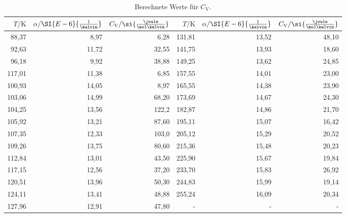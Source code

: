 \begin{table}[htpb]
	\centering
	\caption{Berechnete Werte für $C_\text{V}$.}
	\label{tab:cv}
	\begin{tabular}{rrr|rrr}
		\toprule
		$T/\si{\kelvin}$ & $\alpha/\SI{E-6}{\frac{1}{\kelvin}}$  & $C_\text{V}/\si{\frac{\joule}{\mol \kelvin}}$ & $T/\si{\kelvin}$ & $\alpha/\SI{E-6}{\frac{1}{\kelvin}}$  & $C_\text{V}/\si{\frac{\joule}{\mol \kelvin}}$\\
		\hline
		88,37	&	8,97	&	6,28	&	131,81	&	13,52	&	48,10	\\
		92,63	&	11,72	&	32,55	&	141,75	&	13,93	&	18,60	\\
		96,18	&	9,92	&	38,88	&	149,25	&	13,62	&	24,85	\\
		117,01	&	11,38	&	6,85	&	157,55	&	14,01	&	23,00	\\
		100,93	&	14,05	&	8,97	&	165,55	&	14,38	&	23,90	\\
		103,06	&	14,99	&	68,20	&	173,69	&	14,67	&	24,30	\\
		104,25	&	13,56	&	122,2	&	182,87	&	14,86	&	21,70	\\
		105,92	&	13,21	&	87,60	&	195,11	&	15,07	&	16,42	\\
		107,35	&	12,33	&	103,0	&	205,12	&	15,29	&	20,52	\\
		109,26	&	13,75	&	80,60	&	215,36	&	15,48	&	20,23	\\
		112,84	&	13,01	&	43,50	&	225,90	&	15,67	&	19,84	\\
		117,15	&	12,56	&	37,20	&	233,70	&	15,83	&	26,92	\\
		120,51	&	13,96	&	50,30	&	244,83	&	15,99	&	19,14	\\
		124,11	&	13,41	&	48,88	&	255,24	&	16,09	&	20,34	\\
		127,96	&	12,91	&	47,80	&	 -	    &	-	    &	-	    \\
		\bottomrule
	\end{tabular}
\end{table}

